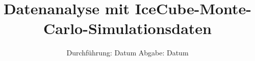 

\subject{Lehrstuhlversuch E5b}
\title{Datenanalyse mit IceCube-Monte-Carlo-Simulationsdaten}
\date{
  Durchführung: Datum
  \hspace{3em}
  Abgabe: Datum
}



\maketitle
\newpage





%



\printbibliography


